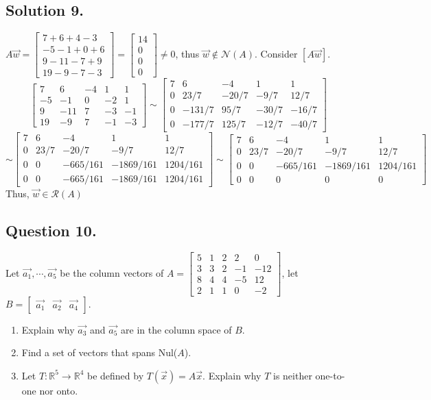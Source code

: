 \documentclass{article}
\begin{document}
\subsection*{Solution 9.}
$A\Vec{w}=\left[\begin{array}{r}7+6+4-3\\-5-1+0+6\\9-11-7+9\\19-9-7-3\end{array}\right]=\left[\begin{array}{r}14\\0\\0\\0\end{array}\right]\neq 0$, thus $\Vec{w}\notin \mathcal{N}(A)$.\newline
Consider $[A\Vec{w}]$.
\[\left[\begin{array}{rrrrr}7&6&-4&1&1\\-5&-1&0&-2&1\\9&-11&7&-3&-1\\19&-9&7&-1&-3\end{array}\right]\sim\left[\begin{array}{rrrrr}7&6&-4&1&1\\0&23/7&-20/7&-9/7&12/7\\0&-131/7&95/7&-30/7&-16/7\\0&-177/7&125/7&-12/7&-40/7\end{array}\right]\]
\[\sim\left[\begin{array}{rrrrr}7&6&-4&1&1\\0&23/7&-20/7&-9/7&12/7\\0&0&-665/161&-1869/161&1204/161\\0&0&-665/161&-1869/161&1204/161\end{array}\right]\sim\left[\begin{array}{rrrrr}7&6&-4&1&1\\0&23/7&-20/7&-9/7&12/7\\0&0&-665/161&-1869/161&1204/161\\0&0&0&0&0\end{array}\right]\]
Thus, $\Vec{w}\in\mathcal{R}(A)$
\subsection*{Question 10.}
Let $\Vec{a_1},\cdots,\Vec{a_5}$ be the column vectors of $A=\left[\begin{array}{rrrrr}5&1&2&2&0\\3&3&2&-1&-12\\8&4&4&-5&12\\2&1&1&0&-2\end{array}\right]$, let $B=[\begin{array}{ccc}\Vec{a_1}&\Vec{a_2}&\Vec{a_4}\end{array}]$.
\begin{enumerate}
    \item Explain why $\Vec{a_3}$ and $\Vec{a_5}$ are in the column space of $B$.
    \item Find a set of vectors that spans Nul($A$).
    \item Let $T:\mathbb{R}^5\rightarrow\mathbb{R}^4$ be defined by $T(\Vec{x})=A\Vec{x}$. Explain why $T$ is neither one-to-one nor onto.
\end{enumerate}
\end{document}
